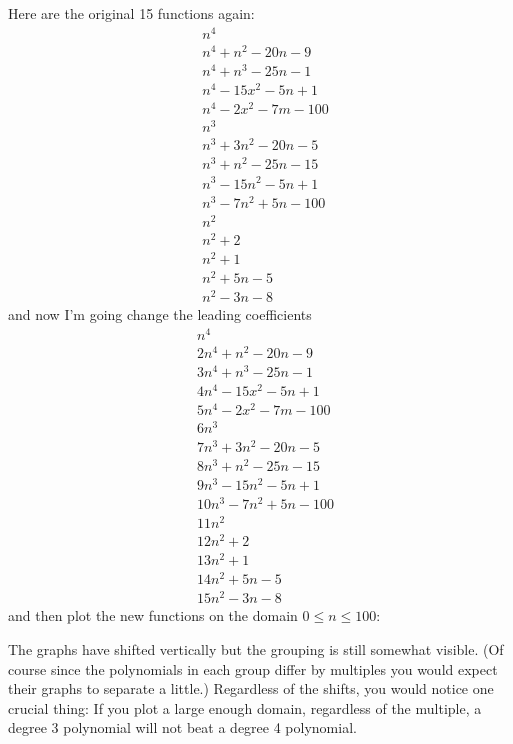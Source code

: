 Here are the original 15 functions again:
\begin{align*}
&n^4 \\
&n^4 + n^2 - 20n - 9 \\
&n^4 +  n^3 - 25n - 1 \\
&n^4 - 15x^2 - 5n + 1 \\
&n^4 - 2x^2 - 7m - 100 \\
&n^3 \\
&n^3 + 3n^2 - 20n - 5 \\
&n^3 +   n^2 - 25n - 15 \\
&n^3 - 15n^2 - 5n + 1 \\
&n^3 - 7n^2 + 5n - 100 \\
&n^2 \\
&n^2 + 2 \\
&n^2 + 1 \\
&n^2 + 5n - 5 \\
&n^2 - 3n - 8
\end{align*}
and now I'm going change the leading coefficients
\begin{align*}
&n^4 \\
&2n^4 + n^2 - 20n - 9 \\
&3n^4 +  n^3 - 25n - 1 \\
&4n^4 - 15x^2 - 5n + 1 \\
&5n^4 - 2x^2 - 7m - 100 \\
&6n^3 \\
&7n^3 + 3n^2 - 20n - 5 \\
&8n^3 +   n^2 - 25n - 15 \\
&9n^3 - 15n^2 - 5n + 1 \\
&10n^3 - 7n^2 + 5n - 100 \\
&11n^2 \\
&12n^2 + 2 \\
&13n^2 + 1 \\
&14n^2 + 5n - 5 \\
&15n^2 - 3n - 8
\end{align*}
and then plot the new functions on the domain $0 \leq n \leq 100$:


The graphs have shifted vertically but the grouping is still somewhat visible.
(Of course since the polynomials in each group differ by 
multiples you would expect their graphs to separate a little.)
Regardless of the shifts, you would notice one crucial thing:
If you plot a large enough domain, regardless of the multiple,
a degree 3 polynomial will not beat a degree 4 polynomial.

